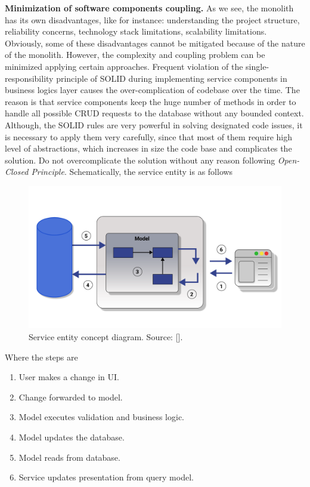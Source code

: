 \textbf{Minimization of software components coupling.} As we see, the monolith has its own disadvantages, like for instance:
understanding the project structure, reliability concerns, technology stack limitations, scalability limitations.
Obviously, some of these disadvantages cannot be mitigated because of the nature of the monolith.
However, the complexity and coupling problem can be minimized applying certain approaches.
Frequent violation of the single-responsibility principle of SOLID during implementing service components
in business logics layer causes the over-complication of codebase over the time.
The reason is that service components keep the huge number of methods in order to handle all possible CRUD requests
to the database without any bounded context.
Although, the SOLID rules are very powerful in solving designated code issues, it is necessary to apply them very carefully,
since that most of them require high level of abstractions, which increases in size the code base and complicates the
solution.
Do not overcomplicate the solution without any reason following \textit{Open-Closed Principle}.
Schematically, the service entity is as follows
\begin{figure}[H]
    \centering
    \includegraphics[width=1\textwidth]{Pictures/04_Service_entity_concept_diagram}
    \caption{Service entity concept diagram. Source: [\cite{fowler2011cqrs}].}\label{fig:figure9}
\end{figure}
Where the steps are
\begin{enumerate}
    \item User makes a change in UI\@.
    \item Change forwarded to model.
    \item Model executes validation and business logic.
    \item Model updates the database.
    \item Model reads from database.
    \item Service updates presentation from query model.
\end{enumerate}

